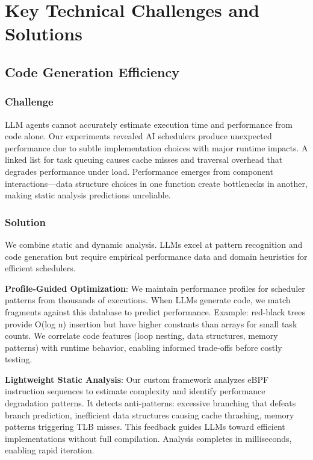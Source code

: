 \section{Key Technical Challenges and Solutions}

\subsection{Code Generation Efficiency}

\subsubsection{Challenge}
LLM agents cannot accurately estimate execution time and performance from code alone. Our experiments revealed AI schedulers produce unexpected performance due to subtle implementation choices with major runtime impacts. A linked list for task queuing causes cache misses and traversal overhead that degrades performance under load. Performance emerges from component interactions—data structure choices in one function create bottlenecks in another, making static analysis predictions unreliable.

\subsubsection{Solution}
We combine static and dynamic analysis. LLMs excel at pattern recognition and code generation but require empirical performance data and domain heuristics for efficient schedulers.

\textbf{Profile-Guided Optimization}: We maintain performance profiles for scheduler patterns from thousands of executions. When LLMs generate code, we match fragments against this database to predict performance. Example: red-black trees provide O(log n) insertion but have higher constants than arrays for small task counts. We correlate code features (loop nesting, data structures, memory patterns) with runtime behavior, enabling informed trade-offs before costly testing.

\textbf{Lightweight Static Analysis}: Our custom framework analyzes eBPF instruction sequences to estimate complexity and identify performance degradation patterns. It detects anti-patterns: excessive branching that defeats branch prediction, inefficient data structures causing cache thrashing, memory patterns triggering TLB misses. This feedback guides LLMs toward efficient implementations without full compilation. Analysis completes in milliseconds, enabling rapid iteration.

